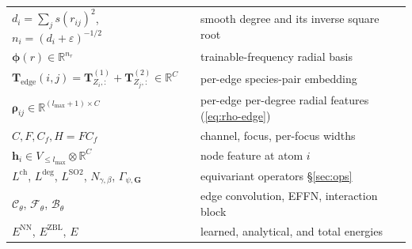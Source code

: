 \documentclass[11pt,a4paper]{article}
\newcommand{\R}{\mathbb{R}}
\newcommand{\bG}{\bm{G}}
\newcommand{\bh}{\bm{h}}
\newcommand{\Te}{\bm{T}}
\newcommand{\bphi}{\bm{\phi}}
\newcommand{\brho}{\bm{\rho}}
\newcommand{\lmax}{l_{\max}}
\theoremstyle{plain}
\theoremstyle{definition}
\theoremstyle{remark}
\begin{document}
\begin{tabular}{ll}
    $d_i=\sum_j s(r_{ij})^2$, $n_i=(d_i+\varepsilon)^{-1/2}$                                           & smooth degree and its inverse square root                   \\
    $\bphi(r)\in\R^{n_r}$                                                                              & trainable-frequency radial basis                            \\
    $\Te_{\mathrm{edge}}(i,j)=\Te^{(1)}_{Z_i,:}+\Te^{(2)}_{Z_j,:}\in\R^{C}$                            & per-edge species-pair embedding                             \\
    $\brho_{ij}\in\R^{(\lmax+1)\times C}$                                                              & per-edge per-degree radial features (\eqref{eq:rho-edge})   \\
    $C, F, C_f, H=FC_f$                                                                                & channel, focus, per-focus widths                            \\
    $\bh_i\in V_{\le\lmax}\otimes\R^C$                                                                 & node feature at atom $i$                                    \\
    $L^{\mathrm{ch}}$, $L^{\mathrm{deg}}$, $L^{\mathrm{SO2}}$, $N_{\gamma,\beta}$, $\Gamma_{\psi,\bG}$ & equivariant operators \S\ref{sec:ops}                       \\
    $\mathcal{C}_\theta$, $\mathcal{F}_\theta$, $\mathcal{B}_\theta$                                   & edge convolution, EFFN, interaction block                   \\
    $E^{\mathrm{NN}}$, $E^{\mathrm{ZBL}}$, $E$                                                         & learned, analytical, and total energies
\end{tabular}
\end{document}
